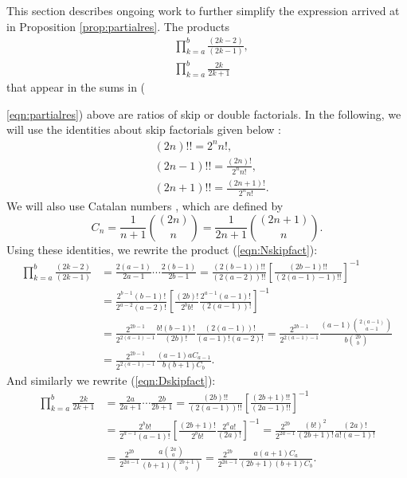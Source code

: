\documentclass[11pt]{article}
\theoremstyle{mythm}
\begin{document}
This section describes ongoing work to further simplify the expression arrived at in Proposition \ref{prop:partialres}. The products
\begin{align}
&\prod\limits_{k=a}^{b}\frac{(2k-2)}{(2k-1)}, \label{eqn:Nskipfact}\\
&\prod\limits_{k=a}^b\frac{2k}{2k+1} \label{eqn:Dskipfact}
\end{align}
that appear in the sums in ({\ref{eqn:partialres}) above are ratios of skip or double factorials. In the following, we will use the identities about skip factorials given below \cite{weisstein_double_nodate}:
\begin{align*}
&(2n)!! = 2^nn!, \\
&(2n-1)!! = \frac{(2n)!}{2^nn!}, \\
&(2n+1)!! = \frac{(2n+1)!}{2^nn!}.
\end{align*}
We will also use Catalan numbers \cite{weisstein_catalan_nodate}, which are defined by
\begin{equation*}
C_n = \frac{1}{n+1}\binom{(2n)}{n} = \frac{1}{2n+1}\binom{(2n+1)}{n}.
\end{equation*}
Using these identities, we rewrite the product (\ref{eqn:Nskipfact}):
\begin{equation}\label{eqn:Nskipfactsimp}
\begin{aligned}
\prod\limits_{k=a}^{b}\frac{(2k-2)}{(2k-1)} &= \frac{2(a-1)}{2a-1}\cdots\frac{2(b-1)}{2b-1} = \frac{(2(b-1))!!}{(2(a-2))!!}\left[\frac{(2b-1)!!}{(2(a-1)-1)!!}\right]^{-1} \\
&= \frac{2^{b-1}(b-1)!}{2^{a-2}(a-2)!}\left[\frac{(2b)!}{2^bb!}\frac{2^{a-1}(a-1)!}{(2(a-1))!}\right]^{-1} \\
&= \frac{2^{2b-1}}{2^{2(a-1)-1}}\frac{b!(b-1)!}{(2b)!}\frac{(2(a-1))!}{(a-1)!(a-2)!} = \frac{2^{2b-1}}{2^{2(a-1)-1}}\frac{(a-1)\binom{2(a-1)}{a-1}}{b\binom{2b}{b}} \\
&= \frac{2^{2b-1}}{2^{2(a-1)-1}}\frac{(a-1)aC_{a-1}}{b(b+1)C_b}.
\end{aligned}
\end{equation}
And similarly we rewrite (\ref{eqn:Dskipfact}):
\begin{equation}\label{eqn:Dskipfactsimp}
\begin{aligned}
\prod\limits_{k=a}^b\frac{2k}{2k+1} &= \frac{2a}{2a+1}\cdots\frac{2b}{2b+1} = \frac{(2b)!!}{(2(a-1))!!}\left[\frac{(2b+1)!!}{(2a-1)!!}\right]^{-1} \\
&= \frac{2^bb!}{2^{a-1}(a-1)!}\left[\frac{(2b+1)!}{2^bb!}\frac{2^aa!}{(2a)!}\right]^{-1} = \frac{2^{2b}}{2^{2a-1}}\frac{(b!)^2}{(2b+1)!}\frac{(2a)!}{a!(a-1)!} \\
&= \frac{2^{2b}}{2^{2a-1}}\frac{a\binom{2a}{a}}{(b+1)\binom{2b+1}{b}} = \frac{2^{2b}}{2^{2a-1}}\frac{a(a+1)C_a}{(2b+1)(b+1)C_b}.
\end{aligned}
\end{equation}

}
\end{document}
